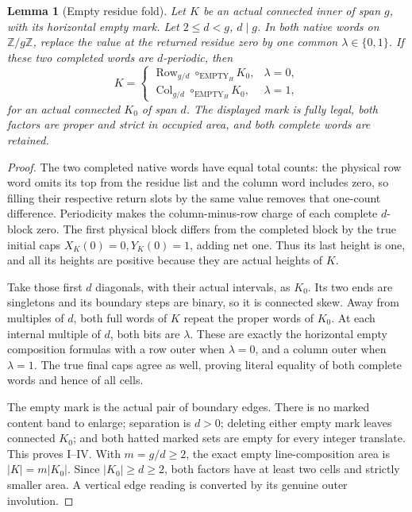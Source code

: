 \documentclass[11pt,a4paper]{amsart}
\numberwithin{equation}{section}
\theoremstyle{plain}
\newtheorem{lemma}[theorem]{Lemma}
\theoremstyle{definition}
\newcommand{\Z}{\mathbb Z}
\begin{document}
\begin{lemma}[Empty residue fold]\label{ge:empty-fold}
Let \(K\) be an actual connected inner of span \(g\), with its
horizontal empty mark.  Let \(2\le d<g\), \(d\mid g\).
In both native words on \(\Z/g\Z\), replace the value at the
returned residue zero by one common \(\lambda\in\{0,1\}\).
If these two completed words are \(d\)-periodic, then
\[
 K=\begin{cases}
 \operatorname{Row}_{g/d}\circ_{\mathrm{EMPTY}_H}K_0,&\lambda=0,\\
 \operatorname{Col}_{g/d}\circ_{\mathrm{EMPTY}_H}K_0,&\lambda=1,
 \end{cases}
\]
for an actual connected \(K_0\) of span \(d\).  The displayed
mark is fully legal, both factors are proper and strict in occupied
area, and both complete words are retained.
\end{lemma}
\begin{proof}
The two completed native words have equal total counts: the physical
row word omits its top from the residue list and the column word
includes zero, so filling their respective return slots by the same
value removes that one-count difference.  Periodicity makes the
column-minus-row charge of each complete \(d\)-block zero.
The first physical block differs from the completed block by the true
initial caps \(X_K(0)=0,Y_K(0)=1\), adding net one.
Thus its last height is one, and all its heights are positive because
they are actual heights of \(K\).

Take those first \(d\) diagonals, with their actual intervals, as
\(K_0\).  Its two ends are singletons and its boundary steps are
binary, so it is connected skew.  Away from multiples of \(d\),
both full words of \(K\) repeat the proper words of \(K_0\).
At each internal multiple of \(d\), both bits are \(\lambda\).
These are exactly the horizontal empty composition formulas with a row
outer when \(\lambda=0\), and a column outer when \(\lambda=1\).
The true final caps agree as well, proving literal equality of both
complete words and hence of all cells.

The empty mark is the actual pair of boundary edges.  There is no
marked content band to enlarge; separation is \(d>0\); deleting
either empty mark leaves connected \(K_0\); and both hatted marked
sets are empty for every integer translate.  This proves I--IV.
With \(m=g/d\ge2\), the exact empty line-composition area is
\(|K|=m|K_0|\).  Since \(|K_0|\ge d\ge2\), both factors
have at least two cells and strictly smaller area.  A vertical edge
reading is converted by its genuine outer involution.
\end{proof}
\end{document}
